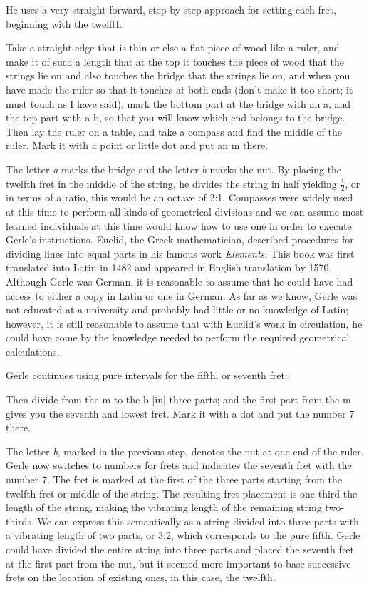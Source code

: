He uses a very straight-forward, step-by-step approach for setting each fret, beginning
with the twelfth.
\begin{blocks}
Take a straight-edge that is thin or else a flat piece of wood like a ruler, and make it
of such a length that at the top it touches the piece of wood that the strings lie on and
also touches the bridge that the strings lie on, and when you have made the ruler so that
it touches at both ends (don't make it too short; it must touch as I have said), mark the
bottom part at the bridge with an a, and the top part with a b, so that you will know
which end belongs to the bridge. Then lay the ruler on a table, and take a compass and
find the middle of the ruler. Mark it with a point or little dot and put an m there.
\end{blocks}
The letter \textit{a} marks the bridge and the letter \textit{b} marks the nut.
By placing the twelfth fret in the middle of the string, he divides the string in half
yielding $ \frac{1}{2} $, or in terms of a ratio, this would be an octave of 2:1.
Compasses were widely used at this time to perform all kinds of geometrical divisions and
we can assume most learned individuals at this time would know how to use one in order to
execute Gerle's instructions. Euclid, the Greek mathematician, described procedures for
dividing lines into equal parts in his famous work \textit{Elements}. This book was
first translated into Latin in 1482 and appeared in English translation by 1570. Although
Gerle was German, it is reasonable to assume that he could have had access to either a
copy in Latin or one in German. As far as we know, Gerle was not educated at a university
and probably had little or no knowledge of Latin; however, it is still reasonable to
assume that with Euclid's work in circulation, he could have come by the knowledge needed
to perform the required geometrical calculations.

Gerle continues using pure intervals for the fifth, or seventh fret:
\begin{blocks}
Then divide from the m to the b [in] three parts; and the first part from the m gives you
the seventh and lowest fret. Mark it with a dot and put the number 7 there.
\end{blocks}
The letter \textit{b}, marked in the previous step, denotes the nut at one end of the ruler.
Gerle now switches to numbers for frets and indicates the seventh fret with the number 7.
The fret is marked at the first of the three parts starting from the twelfth fret or
middle of the string. The resulting fret placement is one-third the length of the string,
making the vibrating length of the remaining string two-thirds. We can express this
semantically as a string divided into three parts with a vibrating length of two parts, or
3:2, which corresponds to the pure fifth. Gerle could have divided the entire string into
three parts and placed the seventh fret at the first part from the nut, but it seemed more
important to base successive frets on the location of existing ones, in this case, the
twelfth.

